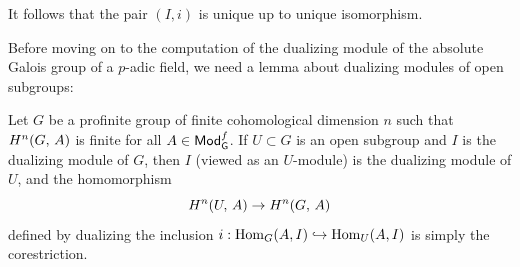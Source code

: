 \documentclass[a4paper, oneside]{memoir}
\begin{document}
\begin{corollary}
	It follows that the pair \((I,i)\) is unique up to unique isomorphism.
\end{corollary}

Before moving on to the computation of the dualizing module of the absolute Galois group of a \(p\)-adic field, we need a lemma about dualizing modules of open subgroups:

\begin{lemma}\label{lm:DualOpenSgr}
	Let \(G\) be a profinite group of finite cohomological dimension \(n\) such that \(H^{n}( G, \, A )\) is finite for all \(A\in\mathsf{Mod}_{\mathsf{G}}^f\). If \(U\subset G\) is an open subgroup and \(I\) is the dualizing module of \(G\), then \(I\) (viewed as an \(U\)-module) is the dualizing module of \(U\), and the homomorphism
	\[
		H^{n}( U, \, A )\to H^{n}( G, \, A )
	\]
	defined by dualizing the inclusion \(i:\operatorname{Hom}_G(A,I) \hookrightarrow \operatorname{Hom}_U(A,I) \) is simply the corestriction.
\end{lemma}
\end{document}
